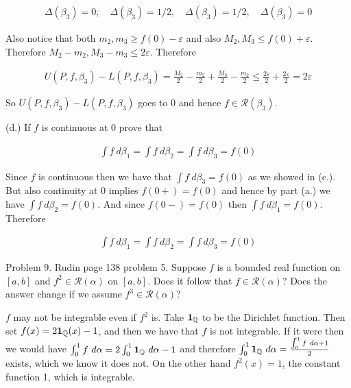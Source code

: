 \documentclass{article}
\begin{document}
  \begin{align*}
    \Delta(\beta_3)=0, \quad \Delta(\beta_3)=1/2, \quad \Delta(\beta_3)=1/2,\quad \Delta(\beta_3)=0
  \end{align*}

  Also notice that both $m_2, m_3 \geq f(0)-\varepsilon$ and also $M_2,M_3\leq f(0)+\varepsilon$.  Therefore $M_2-m_2, M_3-m_3 \leq 2\varepsilon$. Therefore

  \begin{align*}
    U(P,f,\beta_3)-L(P,f,\beta_3)=\frac{M_2}{2}-\frac{m_2}{2}+\frac{M_3}{2}-\frac{m_2}{2} \leq \frac{2\varepsilon}{2}+\frac{2\varepsilon}{2}=2\varepsilon
  \end{align*}

  So $U(P,f,\beta_3)-L(P,f,\beta_3)$ goes to 0 and hence $f\in\mathscr R(\beta_3)$.

  \vspace{1cm}

  {\Large \color{Sepia} (d.) If $f$ is continuous at 0 prove that

  \begin{align*}
    \int f \ d\beta_1 = \int f\ d\beta_2 = \int f\ d\beta_3 = f(0)
  \end{align*}}

  \vspace{1cm}

  Since $f$ is continuous then we have that $\int f \ d\beta_3= f(0)$ as we showed in (c.).  But also continuity at 0 implies $f(0+)=f(0)$ and hence by part (a.) we have $\int f\ d\beta_2 = f(0)$.  And since $f(0-)=f(0)$ then $\int f \ d\beta_1 = f(0)$.  Therefore

  \begin{align*}
    \int f \ d\beta_1 = \int f\ d\beta_2 = \int f\ d\beta_3 = f(0)
  \end{align*}

  \pagebreak
  {\Large \color{Sepia} Problem 9. Rudin page 138 problem 5. Suppose $f$ is a bounded real function on $[a,b]$ and $f^2\in\mathscr R(\alpha)$ on $[a,b]$.  Does it follow that $f\in\mathscr R(\alpha)$?  Does the answer change if we assume $f^3\in\mathscr R(\alpha)$?}

  \vspace{1cm}

  $f$ may not be integrable even if $f^2$ is. Take ${\bf 1}_{\mathbb Q}$ to be the Dirichlet function. Then set $f(x)=2{\bf 1}_{\mathbb Q}(x)-1$, and then we have that $f$ is not integrable. If it were then we would have $\int_0^1 f \ d\alpha = 2\int_{0}^1{\bf 1}_{\mathbb Q}\ d\alpha -1$ and therefore $\int_{0}^1 {\bf 1}_{\mathbb Q} \ d\alpha = \frac{\int_{0}^1 f \ d\alpha + 1}{2}$ exists, which we know it does not. On the other hand $f^2(x)=1$, the constant function 1, which is integrable.
\end{document}
